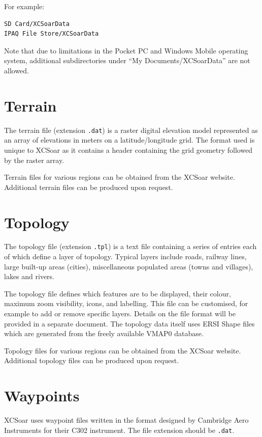 \documentclass[a4paper,12pt]{refrep}
\begin{document}
For example:
\begin{verbatim}
SD Card/XCSoarData
IPAQ File Store/XCSoarData
\end{verbatim}


Note that due to limitations in the Pocket PC and Windows Mobile
operating system, additional subdirectories under ``My
Documents/XCSoarData'' are not allowed.

\section{Terrain}

The terrain file (extension \verb|.dat|) is a raster digital elevation
model represented as an array of elevations in meters on a
latitude/longitude grid.  The format used is unique to XCSoar as it
contains a header containing the grid geometry followed by the raster
array.

Terrain files for various regions can be obtained from the XCSoar website.
Additional terrain files can be produced upon request.

\section{Topology}

The topology file (extension \verb|.tpl|) is a text file containing a
series of entries each of which define a layer of topology.  Typical
layers include roads, railway lines, large built-up areas (cities),
miscellaneous populated areas (towns and villages), lakes and rivers.

The topology file defines which features are to be displayed, their
colour, maximum zoom visibility, icons, and labelling.  This file can
be customised, for example to add or remove specific layers.  Details
on the file format will be provided in a separate document.  The
topology data itself uses ERSI Shape files which are generated from the
freely available VMAP0 database.

Topology files for various regions can be obtained from the XCSoar
website.  Additional topology files can be produced upon request.

\section{Waypoints}

XCSoar uses waypoint files written in the format designed by Cambridge
Aero Instruments for their C302 instrument.  The file extension should
be \verb|.dat|.
\end{document}
